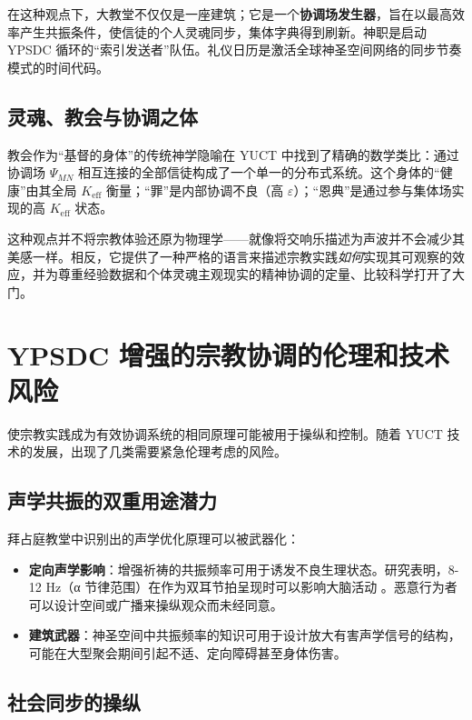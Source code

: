 \documentclass[12pt,a4paper]{article}
\begin{document}
	在这种观点下，大教堂不仅仅是一座建筑；它是一个\textbf{协调场发生器}，旨在以最高效率产生共振条件，使信徒的个人灵魂同步，集体字典得到刷新。神职是启动 YPSDC 循环的“索引发送者”队伍。礼仪日历是激活全球神圣空间网络的同步节奏模式的时间代码。
	
	\subsection{灵魂、教会与协调之体}
	
	教会作为“基督的身体”的传统神学隐喻在 YUCT 中找到了精确的数学类比：通过协调场 \(\Psi_{MN}\) 相互连接的全部信徒构成了一个单一的分布式系统。这个身体的“健康”由其全局 \(K_{\mathrm{eff}}\) 衡量；“罪”是内部协调不良（高 \(\varepsilon\)）；“恩典”是通过参与集体场实现的高 \(K_{\mathrm{eff}}\) 状态。
	
	这种观点并不将宗教体验还原为物理学——就像将交响乐描述为声波并不会减少其美感一样。相反，它提供了一种严格的语言来描述宗教实践\emph{如何}实现其可观察的效应，并为尊重经验数据和个体灵魂主观现实的精神协调的定量、比较科学打开了大门。
	
	\section{YPSDC 增强的宗教协调的伦理和技术风险}
	\label{sec:risks}
	
	使宗教实践成为有效协调系统的相同原理可能被用于操纵和控制。随着 YUCT 技术的发展，出现了几类需要紧急伦理考虑的风险。
	
	\subsection{声学共振的双重用途潜力}
	
	拜占庭教堂中识别出的声学优化原理可以被武器化：
	
	\begin{itemize}
		\item \textbf{定向声学影响}：增强祈祷的共振频率可用于诱发不良生理状态。研究表明，8-12 Hz（α 节律范围）在作为双耳节拍呈现时可以影响大脑活动 \cite{Garcia2021}。恶意行为者可以设计空间或广播来操纵观众而未经同意。
		
		\item \textbf{建筑武器}：神圣空间中共振频率的知识可用于设计放大有害声学信号的结构，可能在大型聚会期间引起不适、定向障碍甚至身体伤害。
	\end{itemize}
	
	\subsection{社会同步的操纵}
	
\end{document}

